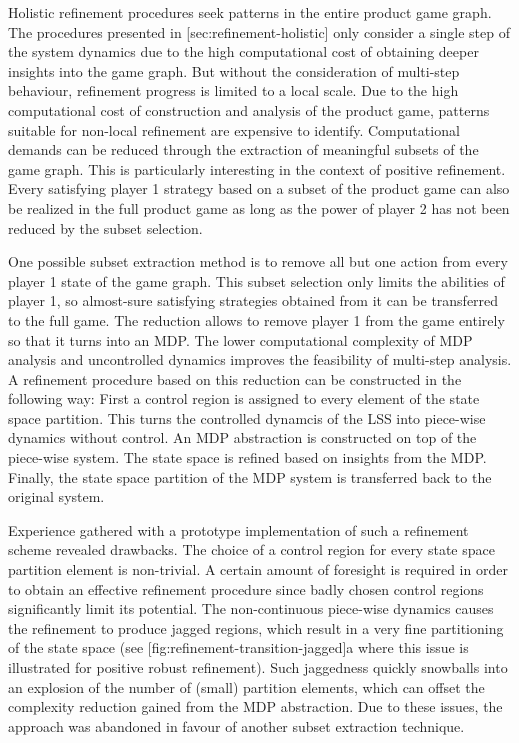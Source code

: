 Holistic refinement procedures seek patterns in the entire product game graph.
The procedures presented in [sec:refinement-holistic] only consider a single step of the system dynamics due to the high computational cost of obtaining deeper insights into the game graph.
But without the consideration of multi-step behaviour, refinement progress is limited to a local scale.
Due to the high computational cost of construction and analysis of the product game, patterns suitable for non-local refinement are expensive to identify.
Computational demands can be reduced through the extraction of meaningful subsets of the game graph.
This is particularly interesting in the context of positive refinement.
Every satisfying player 1 strategy based on a subset of the product game can also be realized in the full product game as long as the power of player 2 has not been reduced by the subset selection.

One possible subset extraction method is to remove all but one action from every player 1 state of the game graph.
This subset selection only limits the abilities of player 1, so almost-sure satisfying strategies obtained from it can be transferred to the full game.
The reduction allows to remove player 1 from the game entirely so that it turns into an MDP.
The lower computational complexity of MDP analysis and uncontrolled dynamics improves the feasibility of multi-step analysis.
A refinement procedure based on this reduction can be constructed in the following way:
First a control region is assigned to every element of the state space partition.
This turns the controlled dynamcis of the LSS into piece-wise dynamics without control.
An MDP abstraction is constructed on top of the piece-wise system.
The state space is refined based on insights from the MDP.
Finally, the state space partition of the MDP system is transferred back to the original system.

Experience gathered with a prototype implementation of such a refinement scheme revealed drawbacks.
The choice of a control region for every state space partition element is non-trivial.
A certain amount of foresight is required in order to obtain an effective refinement procedure since badly chosen control regions significantly limit its potential.
The non-continuous piece-wise dynamics causes the refinement to produce jagged regions, which result in a very fine partitioning of the state space (see [fig:refinement-transition-jagged]a where this issue is illustrated for positive robust refinement).
Such jaggedness quickly snowballs into an explosion of the number of (small) partition elements, which can offset the complexity reduction gained from the MDP abstraction.
Due to these issues, the approach was abandoned in favour of another subset extraction technique.

